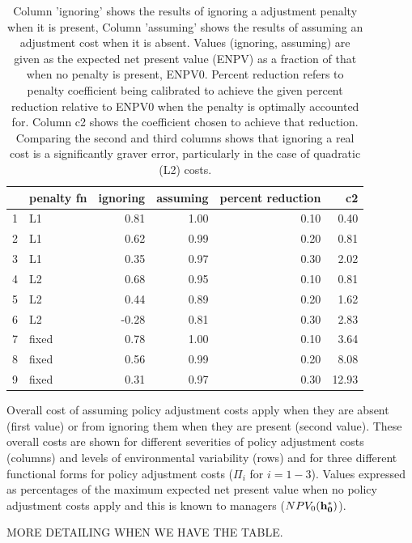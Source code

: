 \documentclass{article}\usepackage[]{graphicx}\usepackage[]{color}
\begin{document}
\begin{table}[ht]
\begin{center}
\begin{tabular}{rlrrrr}
  \hline
 & penalty fn & ignoring & assuming & percent reduction & c2 \\ 
  \hline
1 & L1 & 0.81 & 1.00 & 0.10 & 0.40 \\ 
  2 & L1 & 0.62 & 0.99 & 0.20 & 0.81 \\ 
  3 & L1 & 0.35 & 0.97 & 0.30 & 2.02 \\ 
  4 & L2 & 0.68 & 0.95 & 0.10 & 0.81 \\ 
  5 & L2 & 0.44 & 0.89 & 0.20 & 1.62 \\ 
  6 & L2 & -0.28 & 0.81 & 0.30 & 2.83 \\ 
  7 & fixed & 0.78 & 1.00 & 0.10 & 3.64 \\ 
  8 & fixed & 0.56 & 0.99 & 0.20 & 8.08 \\ 
  9 & fixed & 0.31 & 0.97 & 0.30 & 12.93 \\ 
   \hline
\end{tabular}
\caption{Column 'ignoring' shows the results of ignoring a adjustment penalty when it is present, Column 'assuming' shows the results of assuming an adjustment cost when it is absent. Values (ignoring, assuming) are given as the expected net present value (ENPV) as a fraction of that when no penalty is present, ENPV0.  Percent reduction refers to penalty coefficient being calibrated to achieve the given percent reduction relative to ENPV0 when the penalty is optimally accounted for.  Column c2 shows the coefficient chosen to achieve that reduction. Comparing the second and third columns shows that ignoring a real cost is a significantly graver error, particularly in the case of quadratic (L2) costs.}
\end{center}
\end{table}




Overall cost of assuming policy adjustment costs apply when they are absent (first value) or from ignoring them when they are present (second value). These overall costs are shown for different severities of policy adjustment costs (columns) and levels of environmental variability (rows) and for three different functional forms for policy adjustment costs ($\Pi_i$ for $ i=1-3$). Values expressed as percentages of the maximum expected net present value when no policy adjustment costs apply and this is known to managers ($ NPV_0 ({\bf h_0^*}) $). 


MORE DETAILING WHEN WE HAVE THE TABLE.
\end{document}
